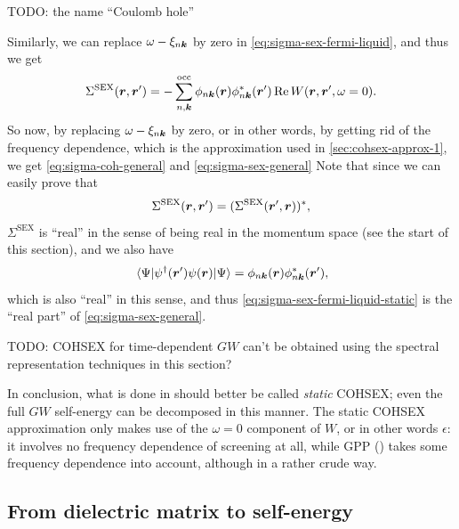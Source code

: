 \documentclass[hyperref, a4paper, 12pt]{report}
\begin{document}
TODO: the name ``Coulomb hole''

Similarly, we can replace $\omega - \xi_{n \vb*{k}}$ by zero in \eqref{eq:sigma-sex-fermi-liquid},
and thus we get 
\begin{equation}
    \Sigma^{\text{SEX}}(\vb*{r}, \vb*{r}')
    = - \sum_{n, \vb*{k}}^{\text{occ}}
    \phi_{n \vb*{k}}(\vb*{r}) \phi_{n \vb*{k}}^*(\vb*{r}') 
    \Re W(\vb*{r}, \vb*{r}', \omega = 0). 
    \label{eq:sigma-sex-fermi-liquid-static}
\end{equation}
So now, by replacing $\omega - \xi_{n \vb*{k}}$ by zero, 
or in other words, 
by getting rid of the frequency dependence,
which is the approximation used in \eqref{sec:cohsex-approx-1},
we get \eqref{eq:sigma-coh-general} and \eqref{eq:sigma-sex-general}
Note that since we can easily prove that 
\[
    \Sigma^{\text{SEX}}(\vb*{r}, \vb*{r}') = 
    (\Sigma^{\text{SEX}}(\vb*{r}', \vb*{r}))^*,
\]
$\Sigma^{\text{SEX}}$ is ``real'' in the sense of 
being real in the momentum space
(see the start of this section),
and we also have 
\begin{equation}
    \expval*{\psi^\dagger(\vb*{r}') \psi(\vb*{r})}{\Psi}
    = \phi_{n \vb*{k}}(\vb*{r}) \phi_{n \vb*{k}}^*(\vb*{r}'),
\end{equation}
which is also ``real'' in this sense, 
and thus \eqref{eq:sigma-sex-fermi-liquid-static} is the ``real part'' of \eqref{eq:sigma-sex-general}.

TODO: COHSEX for time-dependent $GW$ can't be obtained 
using the spectral representation techniques in this section?

In conclusion, what is done in  
should better be called \emph{static} COHSEX;
even the full $GW$ self-energy can be decomposed in this manner.
The static COHSEX approximation only makes use of 
the $\omega = 0$ component of $W$, 
or in other words $\epsilon$:
it involves no frequency dependence of screening at all, 
while GPP () 
takes some frequency dependence into account, 
although in a rather crude way. 

\subsection{From dielectric matrix to self-energy}
\end{document}

